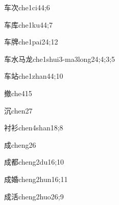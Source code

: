 \begin{verbete}{车次}{che1ci4}{4;6}
\end{verbete}

\begin{verbete}{车库}{che1ku4}{4;7}
\end{verbete}

\begin{verbete}{车牌}{che1pai2}{4;12}
\end{verbete}

\begin{verbete}{车水马龙}{che1shui3-ma3long2}{4;4;3;5}
\end{verbete}

\begin{verbete}{车站}{che1zhan4}{4;10}
\end{verbete}

\begin{verbete}{撤}{che4}{15}
\end{verbete}

\begin{verbete}{沉}{chen2}{7}
\end{verbete}

\begin{verbete}{衬衫}{chen4shan1}{8;8}
\end{verbete}

\begin{verbete}{成}{cheng2}{6}
\end{verbete}

\begin{verbete}{成都}{cheng2du1}{6;10}
\end{verbete}

\begin{verbete}{成婚}{cheng2hun1}{6;11}
\end{verbete}

\begin{verbete}{成活}{cheng2huo2}{6;9}
\end{verbete}

